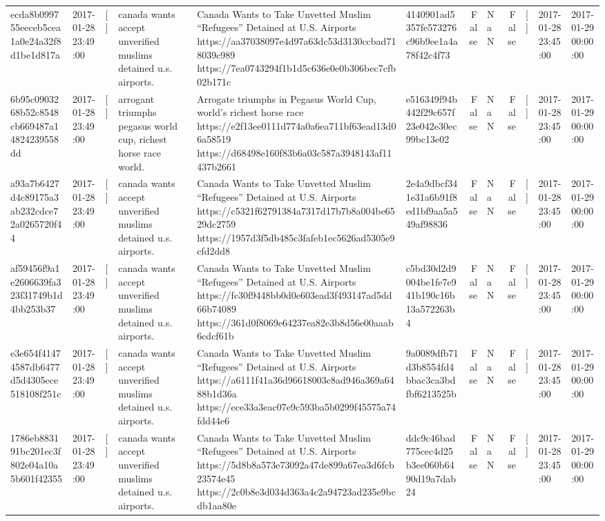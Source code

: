 \begin{tabular}{llllllrlrlll}
ecda8b099755eeceb5cea1a0e24a32f8d1be1d817a & 2017-01-28 23:49:00 & [] & canada wants accept unverified muslims detained u.s. airports. & Canada Wants to Take Unvetted Muslim “Refugees” Detained at U.S. Airports https://aa37038097e4d97a63dc53d3130ccbad718039c989 https://7ea0743294f1b1d5c636e0e0b306bec7cfb02b171c & 4140901ad5357fe573276c96b9ee1a4a78f42c4f73 & False & NaN & False & [] & 2017-01-28 23:45:00 & 2017-01-29 00:00:00 \\
6b95c0903268b52c8548cb669487a14824239558dd & 2017-01-28 23:49:00 & [] & arrogant triumphs pegasus world cup, richest horse race world. & Arrogate triumphs in Pegasus World Cup, world's richest horse race https://e2f13ee0111d774a0a6ea711bf63ead13d06a58519 https://d68498e160f83b6a03c587a3948143af11437b2661 & e516349f94b442f29c657f23e042e30ec99bc13e02 & False & NaN & False & [] & 2017-01-28 23:45:00 & 2017-01-29 00:00:00 \\
a93a7b6427d4c89175a3ab232cdce72a0265720f44 & 2017-01-28 23:49:00 & [] & canada wants accept unverified muslims detained u.s. airports. & Canada Wants to Take Unvetted Muslim “Refugees” Detained at U.S. Airports https://c5321f62791384a7317d17b7b8a004be6529dc2759 https://1957d3f5db485c3fafeb1ec5626ad5305e9cfd2dd8 & 2e4a9dbcf341e31a6b91f8ed1bf9aa5a549af98836 & False & NaN & False & [] & 2017-01-28 23:45:00 & 2017-01-29 00:00:00 \\
af59456f9a1e2606639fa323f31749b1d4bb253b37 & 2017-01-28 23:49:00 & [] & canada wants accept unverified muslims detained u.s. airports. & Canada Wants to Take Unvetted Muslim “Refugees” Detained at U.S. Airports https://fc30f9448bb0d0e603ead3f493147ad5dd66b74089 https://361d0f8069e64237ea82e3b8d56e00aaab6cdcf61b & c5bd30d2d9004be1fe7e941b190c16b13a572263b4 & False & NaN & False & [] & 2017-01-28 23:45:00 & 2017-01-29 00:00:00 \\
e3e654f41474587db6477d5d4305ece518108f251c & 2017-01-28 23:49:00 & [] & canada wants accept unverified muslims detained u.s. airports. & Canada Wants to Take Unvetted Muslim “Refugees” Detained at U.S. Airports https://a6111f41a36d96618003c8ad946a369a6488b1d36a https://ece33a3eac07e9c593ba5b0299f45575a74fdd44e6 & 9a0089dfb71d3b8554fd4bbac3ca3bdfbf6213525b & False & NaN & False & [] & 2017-01-28 23:45:00 & 2017-01-29 00:00:00 \\
1786eb883191bc201ec3f802e04a10a5b601f42355 & 2017-01-28 23:49:00 & [] & canada wants accept unverified muslims detained u.s. airports. & Canada Wants to Take Unvetted Muslim “Refugees” Detained at U.S. Airports https://5d8b8a573e73092a47de899a67ea3d6fcb23574e45 https://2c0b8e3d034d363a4c2a94723ad235e9bcdb1aa80e & ddc9c46bad775cec4d25b3ee060b6490d19a7dab24 & False & NaN & False & [] & 2017-01-28 23:45:00 & 2017-01-29 00:00:00 \\

\end{tabular}
